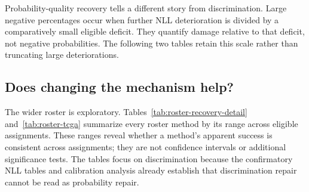 \noindent Probability-quality recovery tells a different story from discrimination. Large negative percentages occur when further NLL deterioration is divided by a comparatively small eligible deficit. They quantify damage relative to that deficit, not negative probabilities. The following two tables retain this scale rather than truncating large deteriorations.
\begin{table}[H]
\centering\footnotesize\setlength{\tabcolsep}{3pt}\renewcommand{\arraystretch}{1.35}

\caption{BRACS raw tail-group NLL recovery (\%), with paired intervals and Holm-adjusted $p$-values. Prevalence-based repair does not extend to the other three signals.}
\label{tab:calibration-recovery-detail}
\end{table}
\begin{table}[H]
\centering\footnotesize\setlength{\tabcolsep}{3pt}\renewcommand{\arraystretch}{1.35}

\caption{TCGA-UT raw tail-group NLL recovery (\%), using the same conventions. Patient-shortage rows are eligible here, unlike on BRACS.}
\label{tab:calibration-recovery-tcga}
\end{table}
\clearpage

\subsection{Does changing the mechanism help?}
The wider roster is exploratory. Tables~\ref{tab:roster-recovery-detail} and~\ref{tab:roster-tcga} summarize every roster method by its range across eligible assignments. These ranges reveal whether a method's apparent success is consistent across assignments; they are not confidence intervals or additional significance tests. The tables focus on discrimination because the confirmatory NLL tables and calibration analysis already establish that discrimination repair cannot be read as probability repair.
\begin{table}[H]
\centering\footnotesize\setlength{\tabcolsep}{4pt}

\caption{Exploratory BRACS discrimination recovery (\%): minimum to maximum across eligible assignments. A single rounded value can represent several similar estimates.}
\label{tab:roster-recovery-detail}
\end{table}
\begin{table}[H]
\centering\footnotesize\setlength{\tabcolsep}{4pt}

\caption{Exploratory TCGA-UT discrimination recovery (\%). CFAL and OKO partly repair patient shortage, but remain far from closing the deficit. Dashes indicate no eligible comparison.}
\label{tab:roster-tcga}
\end{table}

